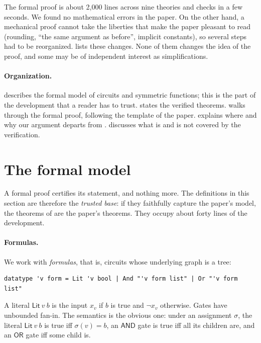 \documentclass[11pt]{article}
\newcommand{\AND}{\mathsf{AND}}
\newcommand{\OR}{\mathsf{OR}}
\begin{document}
The formal proof is about 2{,}000 lines across nine theories and checks in a few seconds. We found no mathematical errors in the paper. On the other hand, a mechanical proof cannot take the liberties that make the paper pleasant to read (rounding, ``the same argument as before'', implicit constants), so several steps had to be reorganized.  lists these changes. None of them changes the idea of the proof, and some may be of independent interest as simplifications.

\paragraph{Organization.}  describes the formal model of circuits and symmetric functions; this is the part of the development that a reader has to trust.  states the verified theorems.  walks through the formal proof, following the template of the paper.  explains where and why our argument departs from \citet{LR26}.  discusses what is and is not covered by the verification.

\section{The formal model}
\label{sec:model}

A formal proof certifies its statement, and nothing more. The definitions in this section are therefore the \emph{trusted base}: if they faithfully capture the paper's model, the theorems of  are the paper's theorems. They occupy about forty lines of the development.

\paragraph{Formulas.} We work with \emph{formulas}, that is, circuits whose underlying graph is a tree:
\begin{Verbatim}[fontsize=\small,xleftmargin=2em]
datatype 'v form = Lit 'v bool | And "'v form list" | Or "'v form list"
\end{Verbatim}
A literal $\mathsf{Lit}\ v\ b$ is the input $x_v$ if $b$ is true and $\neg x_v$ otherwise. Gates have unbounded fan-in. The semantics is the obvious one: under an assignment $\sigma$, the literal $\mathsf{Lit}\ v\ b$ is true iff $\sigma(v) = b$, an $\AND$ gate is true iff all its children are, and an $\OR$ gate iff some child is.
\end{document}
